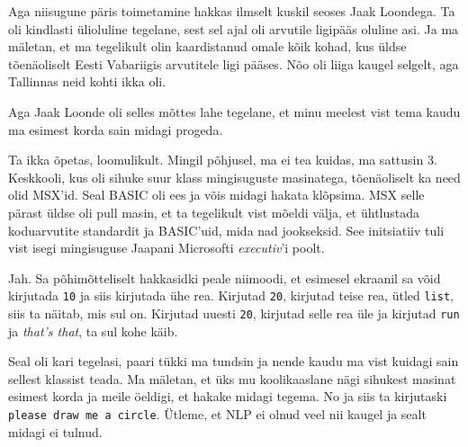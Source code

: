 Aga niisugune päris toimetamine hakkas ilmselt kuskil seoses Jaak Loondega. Ta oli kindlasti ülioluline tegelane, sest sel ajal oli arvutile ligipääs oluline asi. Ja ma mäletan, et ma tegelikult olin kaardistanud omale kõik kohad, kus üldse  tõenäoliselt Eesti Vabariigis arvutitele ligi pääses. Nõo oli liiga kaugel selgelt, aga Tallinnas neid kohti ikka oli. 

Aga Jaak Loonde oli selles mõttes lahe tegelane, et minu meelest vist tema kaudu ma esimest korda sain midagi progeda. 


Ta ikka õpetas, loomulikult. Mingil põhjusel, ma ei tea kuidas, ma sattusin  3. Keskkooli, kus oli sihuke suur klass mingisuguste masinatega, tõenäoliselt ka need olid MSX'id. Seal BASIC oli ees ja võis midagi hakata klõpsima. MSX selle pärast  üldse oli pull masin, et  ta tegelikult vist mõeldi välja, et ühtlustada koduarvutite standardit ja BASIC'uid, mida nad jookseksid.  See initsiatiiv tuli vist isegi  mingisuguse Jaapani Microsofti \emph{executiv}'i poolt.


Jah. Sa põhimõtteliselt hakkasidki peale niimoodi, et esimesel ekraanil sa võid  kirjutada \verb|10| ja siis kirjutada ühe rea. Kirjutad \verb|20|, kirjutad teise rea, ütled \verb|list|, siis ta  näitab, mis sul on. Kirjutad uuesti \verb|20|, kirjutad selle rea üle ja kirjutad \verb|run| ja \emph{that's that}, ta sul kohe käib. 

Seal oli kari tegelasi, paari tükki ma tundsin ja nende kaudu ma vist kuidagi sain sellest klassist teada. Ma mäletan, et üks mu koolikaaslane nägi sihukest masinat esimest korda ja meile öeldigi, et hakake midagi tegema. No ja siis ta kirjutaski \verb|please draw me a circle|. Ütleme, et NLP ei olnud veel nii kaugel ja sealt midagi ei tulnud.

